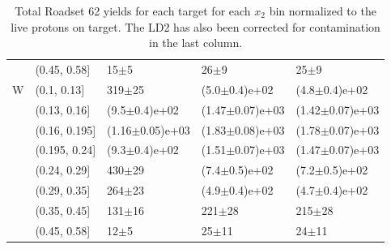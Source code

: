 \begin{table}
\begin{tabular}{lllll}
\rowcol 	& (0.45, 0.58] &             15$\pm$5 &             26$\pm$9 &             25$\pm$9 \\
	W & (0.1, 0.13] &           319$\pm$25 &    (5.0$\pm$0.4)e+02 &    (4.8$\pm$0.4)e+02 \\
	& (0.13, 0.16] &    (9.5$\pm$0.4)e+02 &  (1.47$\pm$0.07)e+03 &  (1.42$\pm$0.07)e+03 \\
	& (0.16, 0.195] &  (1.16$\pm$0.05)e+03 &  (1.83$\pm$0.08)e+03 &  (1.78$\pm$0.07)e+03 \\
	& (0.195, 0.24] &    (9.3$\pm$0.4)e+02 &  (1.51$\pm$0.07)e+03 &  (1.47$\pm$0.07)e+03 \\
	& (0.24, 0.29] &           430$\pm$29 &    (7.4$\pm$0.5)e+02 &    (7.2$\pm$0.5)e+02 \\
	& (0.29, 0.35] &           264$\pm$23 &    (4.9$\pm$0.4)e+02 &    (4.7$\pm$0.4)e+02 \\
	& (0.35, 0.45] &           131$\pm$16 &           221$\pm$28 &           215$\pm$28 \\
	& (0.45, 0.58] &             12$\pm$5 &            25$\pm$11 &            24$\pm$11 \\
	\bottomrule
\end{tabular}
	\caption{Total Roadset 62 yields for each target for each $x_2$ bin normalized to the live protons on target. The LD2 has also been corrected for contamination in the last column.}
	\label{tab:final-yields-62}
\end{table}

